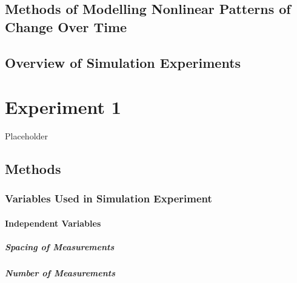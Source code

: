 \documentclass[
12pt, %
twoside,
english]{guelphthesis}
\begin{document}
\hypertarget{methods-of-modelling-nonlinear-patterns-of-change-over-time}{%
\section{Methods of Modelling Nonlinear Patterns of Change Over Time}\label{methods-of-modelling-nonlinear-patterns-of-change-over-time}}

\hypertarget{overview-of-simulation-experiments}{%
\section{Overview of Simulation Experiments}\label{overview-of-simulation-experiments}}

\hypertarget{experiment-1}{%
\chapter{Experiment 1}\label{experiment-1}}

Placeholder

\hypertarget{methods}{%
\section{Methods}\label{methods}}

\hypertarget{variables-used-in-simulation-experiment}{%
\subsection{Variables Used in Simulation Experiment}\label{variables-used-in-simulation-experiment}}

\hypertarget{independent-variables}{%
\subsubsection{Independent Variables}\label{independent-variables}}

\hypertarget{spacing-measurements}{%
\paragraph{Spacing of Measurements}\label{spacing-measurements}}

\hypertarget{number-measurements}{%
\paragraph{Number of Measurements}\label{number-measurements}}
\end{document}
